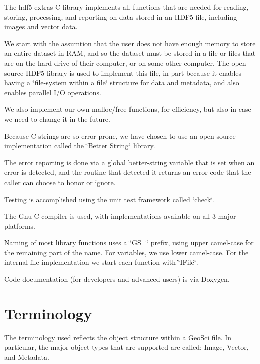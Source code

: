 The hdf5-\/extras C library implements all functions that are needed for reading, storing, processing, and reporting on data stored in an H\+D\+F5 file, including images and vector data.

We start with the assumtion that the user does not have enough memory to store an entire dataset in R\+A\+M, and so the dataset must be stored in a file or files that are on the hard drive of their computer, or on some other computer. The open-\/source H\+D\+F5 library is used to implement this file, in part because it enables having a \char`\"{}file-\/system within a file\char`\"{} structure for data and metadata, and also enables parallel I/\+O operations.

We also implement our own malloc/free functions, for efficiency, but also in case we need to change it in the future.

Because C strings are so error-\/prone, we have chosen to use an open-\/source implementation called the \char`\"{}\+Better String\char`\"{} library.

The error reporting is done via a global better-\/string variable that is set when an error is detected, and the routine that detected it returns an error-\/code that the caller can choose to honor or ignore.

Testing is accomplished using the unit test framework called \char`\"{}check\char`\"{}.

The Gnu C compiler is used, with implementations available on all 3 major platforms.

Naming of most library functions uses a \char`\"{}\+G\+S\+\_\+\char`\"{} prefix, using upper camel-\/case for the remaining part of the name. For variables, we use lower camel-\/case. For the internal file implementation we start each function with \char`\"{}\+I\+File\char`\"{}.

Code documentation (for developers and advanced users) is via Doxygen.\hypertarget{intro_Terminology}{}\section{Terminology}\label{intro_Terminology}
The terminology used reflects the object structure within a Geo\+Sci file. In particular, the major object types that are supported are called\+: Image, Vector, and Metadata.

